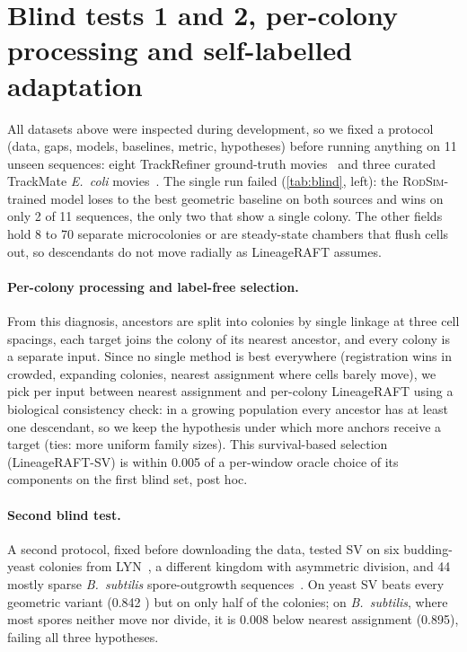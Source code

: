 \documentclass[10pt,twocolumn,letterpaper]{article}
\newcommand{\ours}{LineageRAFT\xspace}
\newcommand{\rodsim}{\textsc{RodSim}\xspace}
\begin{document}
\section{Blind tests 1 and 2, per-colony processing and self-labelled adaptation}
\label{sec:supp-blind12}
All datasets above were inspected during development, so we fixed a protocol (data, gaps, models, baselines, metric, hypotheses) before running anything on 11 unseen sequences: eight TrackRefiner ground-truth movies~\cite{ahmadi2025trackrefiner} and three curated TrackMate \emph{E.\ coli} movies~\cite{anselmet2026trackmate}.
The single run failed (\cref{tab:blind}, left): the \rodsim-trained model loses to the best geometric baseline on both sources and wins on only 2 of 11 sequences, the only two that show a single colony.
The other fields hold 8 to 70 separate microcolonies or are steady-state chambers that flush cells out, so descendants do not move radially as \ours assumes.

\paragraph{Per-colony processing and label-free selection.}
From this diagnosis, ancestors are split into colonies by single linkage at three cell spacings, each target joins the colony of its nearest ancestor, and every colony is a separate input.
Since no single method is best everywhere (registration wins in crowded, expanding colonies, nearest assignment where cells barely move), we pick per input between nearest assignment and per-colony \ours using a biological consistency check: in a growing population every ancestor has at least one descendant, so we keep the hypothesis under which more anchors receive a target (ties: more uniform family sizes).
This survival-based selection (\ours-SV) is within 0.005 of a per-window oracle choice of its components on the first blind set, post hoc.

\paragraph{Second blind test.}
A second protocol, fixed before downloading the data, tested SV on six budding-yeast colonies from LYN~\cite{zelic2026lyn}, a different kingdom with asymmetric division, and 44 mostly sparse \emph{B.\ subtilis} spore-outgrowth sequences~\cite{kunzmann2026bsub}.
On yeast SV beats every geometric variant (0.842 ) but on only half of the colonies; on \emph{B.\ subtilis}, where most spores neither move nor divide, it is 0.008 below nearest assignment (0.895), failing all three hypotheses.
\end{document}
